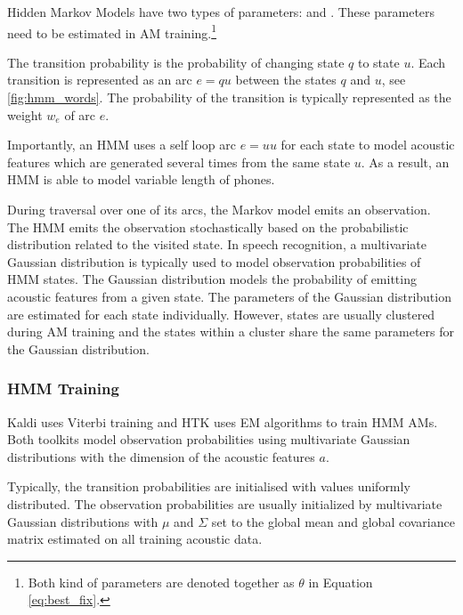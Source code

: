 Hidden Markov Models have two types of parameters:  and . These parameters need to be estimated in \ac{AM} training.\footnote{Both kind of parameters are denoted together as $\theta$ in Equation \ref{eq:best_fix}.}

The transition probability is the probability of changing state $q$ to state $u$. Each transition is represented as an arc $e=qu$ between the states $q$ and $u$, see \ref{fig:hmm_words}. The probability of the transition is typically represented as the weight $w_e$ of arc $e$.

Importantly, an \ac{HMM} uses a self loop arc $e=uu$ for each state to model acoustic features which are generated several times from the same state $u$. As a result, an \ac{HMM} is able to model variable length of phones. %

During traversal over one of its arcs, the Markov model emits an observation. The \acl{HMM} emits the observation stochastically based on the probabilistic distribution related to the visited state. In speech recognition, a multivariate Gaussian distribution is typically used to model observation probabilities of \ac{HMM} states. The Gaussian distribution models the probability of emitting acoustic features from a given state. The parameters of the Gaussian distribution are estimated for each state individually. However, states are usually clustered during \ac{AM} training and the states within a cluster share the same parameters for the Gaussian distribution.


\subsubsection*{\ac{HMM} Training}
\label{sub:trainhmm}

Kaldi uses Viterbi training and \ac{HTK} uses \acl{EM} algorithms to train \ac{HMM} \acl{AM}s. Both toolkits model observation probabilities using multivariate Gaussian distributions with the dimension of the acoustic features $a$. %

Typically, the transition probabilities are initialised with values uniformly distributed. The observation probabilities are usually initialized by multivariate Gaussian distributions with $\mu$ and $\Sigma$ set to the global mean and global covariance matrix estimated on all training acoustic data.

